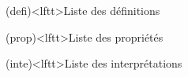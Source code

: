 \documentclass[../../main/main.tex]{subfiles}
\begin{document}


\vspace*{\fill}
\minitoc
\vspace*{\fill}

\newpage

\begin{boxes}
	\begin{tcb}(defi)<lftt>{Liste des définitions}
	\end{tcb}
	\begin{tcb}(prop)<lftt>{Liste des propriétés}
	\end{tcb}
	\begin{tcb}(inte)<lftt>{Liste des interprétations}

\end{tcb}
\end{boxes}
\end{document}
